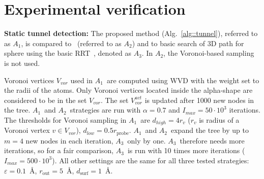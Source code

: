 \documentclass{llncs}
\def\Imax{I_{max}} %
\def\VV{V_{vor}}
\def\VVA{V_{vor}^{act}}
\def\da{d_{high}}
\def\db{d_{low}}
\def\TA{$A_1$}
\def\TB{$A_2$}
\def\TC{$A_3$}
\def\probe{r_{\mathrm{probe}}}
\def\gprobe{r_{\mathrm{out}}}
\def\RRTTD{RRT$_{\mathrm{td}}$}
\def\RRTN{RRT$_{\mathrm{n}}$}
\def\ths{d_\mathrm{surf}}
\begin{document}

\section{Experimental verification}

{\bf Static tunnel detection: }
The proposed method (Alg.~\ref{alg::tunnel}), referred to as \TA, is compared to~\cite{vonasek2016application} (referred to as \TB) and
to basic search of 3D path for sphere using the basic RRT~\cite{lavalleRRT}, denoted as \TC.
In \TB, the Voronoi-based sampling is not used.

Voronoi vertices $\VV$ used in \TA\ are computed using WVD with the weight set to the radii of the atoms.
Only Voronoi vertices located inside the alpha-shape are considered to be in the set $\VV$.
The set $\VVA$ is updated after 1000 new nodes in the tree.
\TA\ and \TB\ strategies are run with $\alpha=0.7$ and $\Imax=50\cdot 10^3$ iterations.
The thresholds for Voronoi sampling in \TA\ are $\da=4r_v$ ($r_v$ is radius of a Voronoi vertex $v \in \VV$), $\db=0.5\probe$.
\TA\ and \TB\ expand the tree by up to $m=4$ new nodes in each iteration, \TC\ only by one.
\TC\ therefore needs more iterations, so for a fair comparison, \TC\ is run with 10 times more iterations ($\Imax=500\cdot10^3$).
All other settings are the same for all three tested strategies:  $\varepsilon=0.1$~\AA, $\gprobe=5$~\AA, $\ths=1$~\AA.


\end{document}
